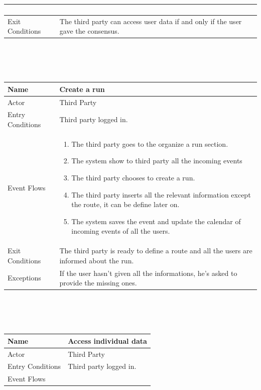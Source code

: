 \documentclass{article}
\begin{document}
\begin{legal}
\begin{legal}
\begin{legal}
\begin{tabular}{| m{3.5cm} | m{8cm}| }
\begin{enumerate}
				\end{enumerate}\\
				\hline
					Exit Conditions & The third party can access user data if and only if the user gave the consensus.\\
				\hline
				\end{tabular}
				\\\\\\
				\begin{tabular}{| m{3.5cm} | m{8cm}| }
				\hline
					Name & Create a run\\
				\hline
					Actor & Third Party\\
				\hline
					Entry Conditions & Third party logged in.\\
				\hline
					Event Flows & \begin{enumerate}
									\item The third party goes to the organize a run section.
									\item The system show to third party all the incoming events
									\item The third party chooses to create a run.
									\item The third party inserts all the relevant information except the route, it can be define later on.
									\item The system saves the event and update the calendar of incoming events of all the users.
				\end{enumerate}\\
				\hline
					Exit Conditions & The third party is ready to define a route and all the users are informed about the run.\\
				\hline 
					Exceptions & If the user hasn't given all the informations, he's asked to provide the missing ones.
					\\
				\hline
				\end{tabular}
				\\\\\\
				\begin{tabular}{| m{3.5cm} | m{8cm}| }
				\hline
					Name & Access individual data\\
				\hline
					Actor & Third Party\\
				\hline
					Entry Conditions & Third party logged in.\\
				\hline
					Event Flows & \begin{enumerate}

\end{enumerate}
\end{tabular}
\end{legal}
\end{legal}
\end{legal}
\end{document}
